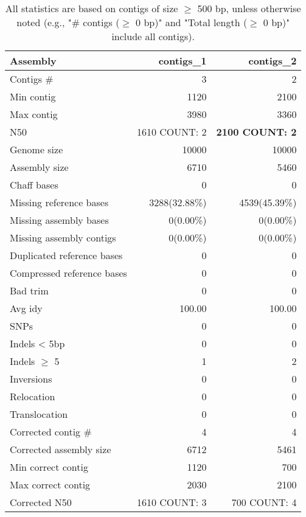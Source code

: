 \documentclass[12pt,a4paper]{article}
\begin{document}
\begin{table}[ht]
\begin{center}
\caption{All statistics are based on contigs of size $\geq$ 500 bp, unless otherwise noted (e.g., "\# contigs ($\geq$ 0 bp)" and "Total length ($\geq$ 0 bp)" include all contigs).}
\begin{tabular}{|l*{2}{|r}|}
\hline
Assembly & contigs\_1 & contigs\_2 \\ \hline
Contigs \# & 3 & 2 \\ \hline
Min contig & 1120 & 2100 \\ \hline
Max contig & 3980 & 3360 \\ \hline
N50 & 1610 COUNT: 2 & {\bf 2100 COUNT: 2} \\ \hline
Genome size & 10000 & 10000 \\ \hline
Assembly size & 6710 & 5460 \\ \hline
Chaff bases & 0 & 0 \\ \hline
Missing reference bases & 3288(32.88\%) & 4539(45.39\%) \\ \hline
Missing assembly bases & 0(0.00\%) & 0(0.00\%) \\ \hline
Missing assembly contigs & 0(0.00\%) & 0(0.00\%) \\ \hline
Duplicated reference bases & 0 & 0 \\ \hline
Compressed reference bases & 0 & 0 \\ \hline
Bad trim & 0 & 0 \\ \hline
Avg idy & 100.00 & 100.00 \\ \hline
SNPs & 0 & 0 \\ \hline
Indels < 5bp & 0 & 0 \\ \hline
Indels $\geq$ 5 & 1 & 2 \\ \hline
Inversions & 0 & 0 \\ \hline
Relocation & 0 & 0 \\ \hline
Translocation & 0 & 0 \\ \hline
Corrected contig \# & 4 & 4 \\ \hline
Corrected assembly size & 6712 & 5461 \\ \hline
Min correct contig & 1120 & 700 \\ \hline
Max correct contig & 2030 & 2100 \\ \hline
Corrected N50 & 1610 COUNT: 3 & 700 COUNT: 4 \\ \hline
\end{tabular}
\end{center}
\end{table}
\end{document}
